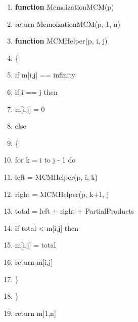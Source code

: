 \documentclass[conference]{IEEEtran}
\begin{document}
\begingroup
\renewcommand\labelenumi{\theenumi:}
\begin{enumerate}
\item \textbf{function} MemoizationMCM(p)  \label{item:1}
\item return MemoizationMCM(p, 1, n) \label{item:4}
\item \textbf{function} MCMHelper(p, i, j)  \label{item:1}
\item \{ \label{item:4}
\item if m[i,j] == infinity \label{item:4}
\item if i == j then
\item m[i,j] = 0 \label{item:4}\label{item:4}
\item else \label{item:4}
\item \{ \label{item:4}
\item for k = i to j - 1 do\label{item:4}
\item left = MCMHelper(p, i, k) \label{item:4}
\item right = MCMHelper(p, k+1, j \label{item:4}
\item total = left + right + PartialProducts \label{item:4}
\item if total < m[i,j] then \label{item:4}
\item m[i,j] = total \label{item:4}
\item return m[i,j] \label{item:4}
\item \} \label{item:4}
\item \} \label{item:4}
\item return m[1,n] \label{item:4}
\end{enumerate}
\endgroup
\end{document}
